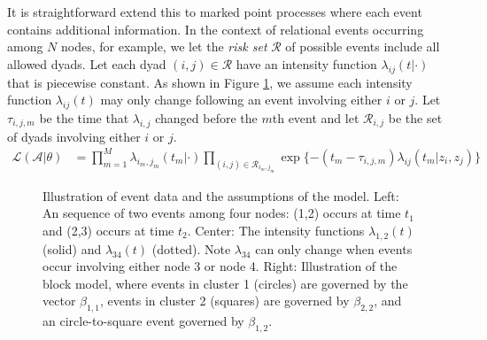 \documentclass[11pt]{article}
\begin{document}
It is straightforward extend this to marked point processes where each event contains additional information.  In the context of relational events occurring among $N$ nodes, for example, we let the \emph{risk set} $\mathcal{R}$ of possible events include all allowed dyads.  Let each dyad $(i,j) \in \mathcal{R}$ have an intensity function $\lambda_{ij}(t|\cdot)$ that is piecewise constant.  As shown in Figure \ref{fig:example}, we assume each intensity function $\lambda_{ij}(t)$ may only change following an event involving either $i$ or $j$.  Let $\tau_{i,j,m}$ be the time that $\lambda_{i,j}$ changed before the $m$th event and let $\mathcal{R}_{i,j}$ be the set of dyads involving either $i$ or $j$.  %
\begin{align}
\mathcal{L}(\mathcal{A}|\theta) &= \prod_{m=1}^M \lambda_{i_m,j_m}(t_m|\cdot) \prod_{(i,j) \in \mathcal{R}_{i_m,j_m}}\exp\{ - (t_m - \tau_{i,j,m}) \lambda_{ij}(t_m | z_i,z_j) \}
\end{align}

\begin{figure}
 \def\svgwidth{6in}
  
\caption{Illustration of event data and the assumptions of the model.  Left: An sequence of two events among four nodes: (1,2) occurs at time $t_1$ and (2,3) occurs at time $t_2$.  Center: The intensity functions $\lambda_{1,2}(t)$ (solid) and $\lambda_{34}(t)$ (dotted).  Note $\lambda_{34}$ can only change when events occur involving either node 3 or node 4.  Right: Illustration of the block model, where events in cluster 1 (circles) are governed by the vector $\beta_{1,1}$, events in cluster 2 (squares) are governed by $\beta_{2,2}$, and an circle-to-square event governed by $\beta_{1,2}$.}
\label{fig:example}
\end{figure}
\end{document}
